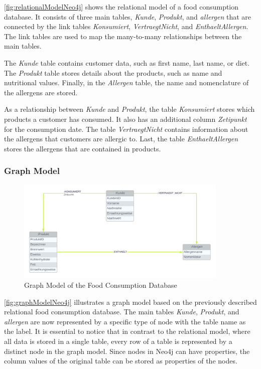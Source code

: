 \autoref{fig:relationalModelNeo4j} shows the relational model of a food consumption database. It consists of three main tables, \textit{Kunde}, \textit{Produkt}, and \textit{allergen} that are connected by the link tables \textit{Konsumiert}, \textit{VertraegtNicht}, and \textit{EnthaeltAllergen}. The link tables are used to map the many-to-many relationships between the main tables.

The \textit{Kunde} table contains customer data, such as first name, last name, or diet. The \textit{Produkt} table stores details about the products, such as name and nutritional values. Finally, in the \textit{Allergen} table, the name and nomenclature of the allergens are stored.

As a relationship between \textit{Kunde} and \textit{Produkt}, the table \textit{Konsumiert} stores which products a customer has consumed. It also has an additional column \textit{Zetipunkt} for the consumption date. The table \textit{VertraegtNicht} contains information about the allergens that customers are allergic to. Last, the table \textit{EnthaeltAllergen} stores the allergens that are contained in products.

\subsubsection*{Graph Model}

\begin{figure}[H]
    \centering
    \caption{Graph Model of the Food Consumption Database}\label{fig:graphModelNeo4j}
    \includegraphics[width=0.9\textwidth]{images/neo4j_example_graph_model.png}
\end{figure}

\autoref{fig:graphModelNeo4j} illustrates a graph model based on the previously described relational food consumption database. The main tables \textit{Kunde}, \textit{Produkt}, and \textit{allergen} are now represented by a specific type of node with the table name as the label. It is essential to notice that in contrast to the relational model, where all data is stored in a single table, every row of a table is represented by a distinct node in the graph model. Since nodes in Neo4j can have properties, the column values of the original table can be stored as properties of the nodes.

